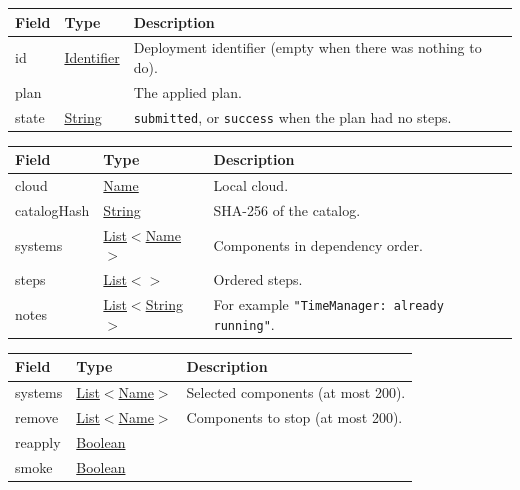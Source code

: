 \documentclass[a4paper]{arrowhead}
\newcommand{\mref}[2][]{{\textcolor{ArrowheadPurple}{\hyperref[sec:model:#2]{\ifstrempty{#1}{#2}{#1}}}}}
\newcommand{\pref}[1]{{\textcolor{ArrowheadGrey}{\hyperref[sec:model:primitives:#1]{#1}}}}
\begin{document}
\noindent\begin{tabularx}{\textwidth}{| >{\raggedright\arraybackslash}p{3.6cm} | >{\raggedright\arraybackslash\small}p{4.4cm} | X |} \hline
\rowcolor{gray!33} Field & Type & Description \\ \hline
id & \pref{Identifier} & Deployment identifier (empty when there was nothing to do). \\ \hline
plan & \mref{Plan} & The applied plan. \\ \hline
state & \pref{String} & \texttt{submitted}, or \texttt{success} when the plan had no steps. \\ \hline
\end{tabularx}


\noindent\begin{tabularx}{\textwidth}{| >{\raggedright\arraybackslash}p{3.6cm} | >{\raggedright\arraybackslash\small}p{4.4cm} | X |} \hline
\rowcolor{gray!33} Field & Type & Description \\ \hline
cloud & \pref{Name} & Local cloud. \\ \hline
catalogHash & \pref{String} & SHA-256 of the catalog. \\ \hline
systems & \pref{List}$<$\pref{Name}$>$ & Components in dependency order. \\ \hline
steps & \pref{List}$<$\mref{Step}$>$ & Ordered steps. \\ \hline
notes & \pref{List}$<$\pref{String}$>$ & For example \texttt{"TimeManager: already running"}. \\ \hline
\end{tabularx}


\noindent\begin{tabularx}{\textwidth}{| >{\raggedright\arraybackslash}p{3.6cm} | >{\raggedright\arraybackslash\small}p{4.4cm} | X |} \hline
\rowcolor{gray!33} Field & Type & Description \\ \hline
systems & \pref{List}$<$\pref{Name}$>$ & Selected components (at most 200). \\ \hline
remove & \pref{List}$<$\pref{Name}$>$ & Components to stop (at most 200). \\ \hline
reapply & \pref{Boolean} &  \\ \hline
smoke & \pref{Boolean} &  \\ \hline
\end{tabularx}

\end{document}
